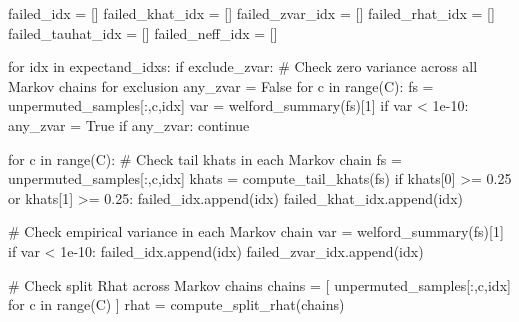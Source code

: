 \documentclass[
  letterpaper,
  DIV=11,
  numbers=noendperiod]{scrartcl}
\newenvironment{Shaded}{\begin{snugshade}}{\end{snugshade}}
\newcommand{\BuiltInTok}[1]{\textcolor[rgb]{0.00,0.23,0.31}{#1}}
\newcommand{\CommentTok}[1]{\textcolor[rgb]{0.37,0.37,0.37}{#1}}
\newcommand{\ControlFlowTok}[1]{\textcolor[rgb]{0.00,0.23,0.31}{#1}}
\newcommand{\DecValTok}[1]{\textcolor[rgb]{0.68,0.00,0.00}{#1}}
\newcommand{\FloatTok}[1]{\textcolor[rgb]{0.68,0.00,0.00}{#1}}
\newcommand{\KeywordTok}[1]{\textcolor[rgb]{0.00,0.23,0.31}{#1}}
\newcommand{\NormalTok}[1]{\textcolor[rgb]{0.00,0.23,0.31}{#1}}
\newcommand{\OperatorTok}[1]{\textcolor[rgb]{0.37,0.37,0.37}{#1}}
\newcommand{\VariableTok}[1]{\textcolor[rgb]{0.07,0.07,0.07}{#1}}
\begin{document}
\begin{Shaded}
\begin{Highlighting}[]
\NormalTok{  failed\_idx }\OperatorTok{=}\NormalTok{ []}
\NormalTok{  failed\_khat\_idx }\OperatorTok{=}\NormalTok{ []}
\NormalTok{  failed\_zvar\_idx }\OperatorTok{=}\NormalTok{ []}
\NormalTok{  failed\_rhat\_idx }\OperatorTok{=}\NormalTok{ []}
\NormalTok{  failed\_tauhat\_idx }\OperatorTok{=}\NormalTok{ []}
\NormalTok{  failed\_neff\_idx }\OperatorTok{=}\NormalTok{ []}

  \ControlFlowTok{for}\NormalTok{ idx }\KeywordTok{in}\NormalTok{ expectand\_idxs:}
    \ControlFlowTok{if}\NormalTok{ exclude\_zvar:}
      \CommentTok{\# Check zero variance across all Markov chains for exclusion}
\NormalTok{      any\_zvar }\OperatorTok{=} \VariableTok{False}
      \ControlFlowTok{for}\NormalTok{ c }\KeywordTok{in} \BuiltInTok{range}\NormalTok{(C):}
\NormalTok{        fs }\OperatorTok{=}\NormalTok{ unpermuted\_samples[:,c,idx]}
\NormalTok{        var }\OperatorTok{=}\NormalTok{ welford\_summary(fs)[}\DecValTok{1}\NormalTok{]}
        \ControlFlowTok{if}\NormalTok{ var }\OperatorTok{\textless{}} \FloatTok{1e{-}10}\NormalTok{:}
\NormalTok{          any\_zvar }\OperatorTok{=} \VariableTok{True}
      \ControlFlowTok{if}\NormalTok{ any\_zvar:}
        \ControlFlowTok{continue}
    
    \ControlFlowTok{for}\NormalTok{ c }\KeywordTok{in} \BuiltInTok{range}\NormalTok{(C):}
      \CommentTok{\# Check tail khats in each Markov chain}
\NormalTok{      fs }\OperatorTok{=}\NormalTok{ unpermuted\_samples[:,c,idx]}
\NormalTok{      khats }\OperatorTok{=}\NormalTok{ compute\_tail\_khats(fs)}
      \ControlFlowTok{if}\NormalTok{ khats[}\DecValTok{0}\NormalTok{] }\OperatorTok{\textgreater{}=} \FloatTok{0.25} \KeywordTok{or}\NormalTok{ khats[}\DecValTok{1}\NormalTok{] }\OperatorTok{\textgreater{}=} \FloatTok{0.25}\NormalTok{:}
\NormalTok{        failed\_idx.append(idx)}
\NormalTok{        failed\_khat\_idx.append(idx)}
    
      \CommentTok{\# Check empirical variance in each Markov chain}
\NormalTok{      var }\OperatorTok{=}\NormalTok{ welford\_summary(fs)[}\DecValTok{1}\NormalTok{]}
      \ControlFlowTok{if}\NormalTok{ var }\OperatorTok{\textless{}} \FloatTok{1e{-}10}\NormalTok{:}
\NormalTok{        failed\_idx.append(idx)}
\NormalTok{        failed\_zvar\_idx.append(idx)}
    
    \CommentTok{\# Check split Rhat across Markov chains}
\NormalTok{    chains }\OperatorTok{=}\NormalTok{ [ unpermuted\_samples[:,c,idx] }\ControlFlowTok{for}\NormalTok{ c }\KeywordTok{in} \BuiltInTok{range}\NormalTok{(C) ]}
\NormalTok{    rhat }\OperatorTok{=}\NormalTok{ compute\_split\_rhat(chains)}
    

\end{Highlighting}
\end{Shaded}
\end{document}
